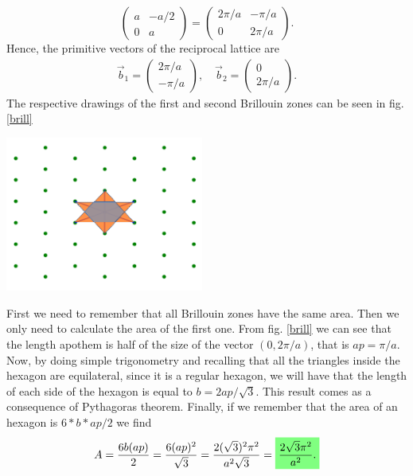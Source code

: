 \begin{questions}
\begin{solution}
\begin{equation}
\begin{pmatrix}
      a & -a/2\\
      0 & a
    \end{pmatrix} = \begin{pmatrix}
      2\pi/a & -\pi/a\\
      0 & 2\pi/a
    \end{pmatrix}.
  \end{equation}
  Hence, the primitive vectors of the reciprocal lattice are
  \begin{eqnarray}
    \vec{b}_1 =\begin{pmatrix}
      2\pi/a\\
      -\pi/a
    \end{pmatrix}, \quad \vec{b}_2 = \begin{pmatrix}
       0\\
       2\pi/a
    \end{pmatrix}.
  \end{eqnarray}
  The respective drawings of the first and second Brillouin zones can be seen in fig. \ref{brill}
  \begin{center}
    \includegraphics[width=65mm]{brill}
  \end{center}
  \label{brill}\vspace{0.5cm}
\end{solution}

\begin{solution}
  First we need to remember that all Brillouin zones have the same area. Then we only need to calculate the area of the first one. From fig. \ref{brill} we can see that the length apothem is half of the size of the vector $(0,2\pi/a)$, that is $ap = \pi/a$. Now, by doing simple trigonometry and recalling that all the triangles inside the hexagon are equilateral, since it is a regular hexagon,   we will have that the length of each side of the hexagon is equal to $b=2ap/\sqrt{3}$. This result comes as a consequence of Pythagoras theorem. Finally, if we remember that the area of an hexagon is $6*b*ap/2$ we find
  \begin{equation}
    A = \frac{6b(ap)}{2} =  \frac{6(ap)^2}{\sqrt{3}} =  \frac{2(\sqrt{3})^2\pi^2}{a^2\sqrt{3}} = \hlgreen{\frac{2\sqrt{3}\pi^2}{a^2}.}
  \end{equation}
\end{solution}

\end{questions}

%
%
